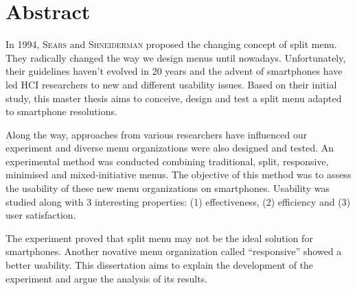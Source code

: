 \chapter*{Abstract}
In 1994, \textsc{Sears} and \textsc{Shneiderman} proposed the changing concept 
of split menu. They radically changed the way we design menus until nowadays. 
Unfortunately, their guidelines haven't evolved in 20 years and the advent of 
smartphones have led HCI researchers to new and different usability issues. 
Based on their initial study, this master thesis aims to conceive, design and 
test a split menu adapted to smartphone resolutions.\newline

Along the way, approaches from various researchers have influenced our 
experiment and diverse menu organizations were also designed and tested. An 
experimental method was conducted combining traditional, split, responsive, 
minimised and mixed-initiative menus. The objective of this method was 
to assess the usability of these new menu organizations on smartphones. 
Usability was studied along with 3 interesting properties: (1) 
effectiveness, (2) efficiency and (3) user satisfaction.\newline

The experiment proved that split menu may not be the ideal solution for 
smartphones. Another novative menu organization called \enquote{responsive} 
showed a better usability. This dissertation aims to explain the development of 
the experiment and argue the analysis of its results.